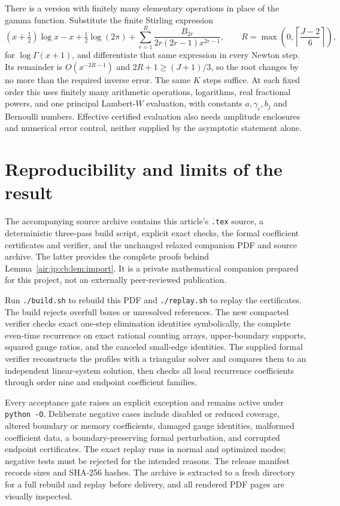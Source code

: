 \documentclass[11pt,letterpaper]{article}
\numberwithin{equation}{section}
\theoremstyle{remark}
\begin{document}
There is a version with finitely many elementary operations in place of the gamma function. Substitute the finite Stirling expression
\[
 (x+\tfrac12)\log x-x+\tfrac12\log(2\pi)
 +\sum_{r=1}^{R}\frac{B_{2r}}{2r(2r-1)x^{2r-1}},
 \qquad R=\max\!\left(0,\left\lceil\frac{J-2}{6}\right\rceil\right),
\]
for $\log\Gamma(x+1)$, and differentiate that same expression in every Newton step. Its remainder is $O(x^{-2R-1})$ and $2R+1\ge(J+1)/3$, so the root changes by no more than the required inverse error. The same $K$ steps suffice. At each fixed order this uses finitely many arithmetic operations, logarithms, real fractional powers, and one principal Lambert-$W$ evaluation, with constants $a,\gamma_c,b_j$ and Bernoulli numbers. Effective certified evaluation also needs amplitude enclosures and numerical error control, neither supplied by the asymptotic statement alone.

\section{Reproducibility and limits of the result}\label{air:jp:cb:sec:reproduce}
The accompanying source archive contains this article's \texttt{.tex} source, a deterministic three-pass build script, explicit exact checks, the formal coefficient certificates and verifier, and the unchanged relaxed companion PDF and source archive. The latter provides the complete proofs behind Lemma~\ref{air:jp:cb:lem:import}. It is a private mathematical companion prepared for this project, not an externally peer-reviewed publication.

Run \texttt{./build.sh} to rebuild this PDF and \texttt{./replay.sh} to replay the certificates. The build rejects overfull boxes or unresolved references. The new compacted verifier checks exact one-step elimination identities symbolically, the complete even-time recurrence on exact rational counting arrays, upper-boundary supports, squared gauge ratios, and the canceled small-edge identities. The supplied formal verifier reconstructs the profiles with a triangular solver and compares them to an independent linear-system solution, then checks all local recurrence coefficients through order nine and endpoint coefficient families.

Every acceptance gate raises an explicit exception and remains active under \texttt{python -O}. Deliberate negative cases include disabled or reduced coverage, altered boundary or memory coefficients, damaged gauge identities, malformed coefficient data, a boundary-preserving formal perturbation, and corrupted endpoint certificates. The exact replay runs in normal and optimized modes; negative tests must be rejected for the intended reasons. The release manifest records sizes and SHA-256 hashes. The archive is extracted to a fresh directory for a full rebuild and replay before delivery, and all rendered PDF pages are visually inspected.
\end{document}
